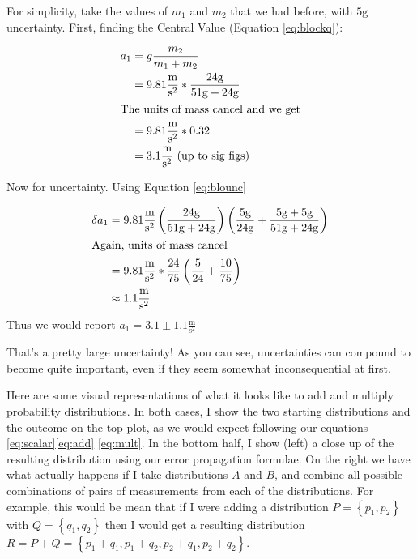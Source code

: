 \documentclass{article}
\begin{document}
  \begin{example}

    For simplicity, take the values of $m_1$ and $m_2$ that we had before, with $5 \mathrm{g}$ uncertainty. First, finding the Central Value (Equation \eqref{eq:blockq}):

    \begin{align}
      a_1&=g\frac{m_2}{m_1+m_2}\\
      &=9.81 \frac{\mathrm{m}}{\mathrm{s}^2} *  \frac{24 \mathrm{g}}{51 \mathrm{g} + 24 \mathrm{g}}\\
      \intertext{The units of mass cancel and we get}
      &= 9.81 \frac{\mathrm{m}}{\mathrm{s}^2} * 0.32\\
      &= 3.1\frac{\mathrm{m}}{\mathrm{s}^2} \text{ (up to sig figs)}
    \end{align}

    Now for uncertainty. Using Equation \eqref{eq:blounc}

    \begin{align}
      \delta a_1 &=  9.81 \frac{\mathrm{m}}{\mathrm{s}^2}\left(\frac{24 \mathrm{g}}{51 \mathrm{g}+24 \mathrm{g}}\right)\left(\frac{5 \mathrm{g}}{24 \mathrm{g}} + \frac{ 5 \mathrm{g} + 5 \mathrm{g}}{51 \mathrm{g} + 24 \mathrm{g}}\right)\\
      \intertext{Again, units of mass cancel}
      &= 9.81 \frac{\mathrm{m}}{\mathrm{s}^2} * \frac{24}{75}\left(\frac{5}{24} + \frac{10}{75}\right)\\
      &\approx 1.1  \frac{\mathrm{m}}{\mathrm{s}^2}
    \end{align}
    Thus we would report $a_1 = 3.1 \pm 1.1\frac{\mathrm{m}}{\mathrm{s}^2}$
  \end{example}

  That's a pretty large uncertainty! As you can see, uncertainties can compound to become quite important, even if they seem somewhat inconsequential at first.

  Here are some visual representations of what it looks like to add and multiply probability distributions. In both cases, I show the two starting distributions and the outcome on the top plot, as we would expect following our equations \eqref{eq:scalar}\eqref{eq:add} \eqref{eq:mult}.
  In the bottom half, I show (left) a close up of the resulting distribution using our error propagation formulae. On the right we have what actually happens if I take distributions $A$ and $B$, and combine all possible combinations of pairs of measurements from each of the distributions.
  For example, this would be mean that if I were adding a distribution $P = \left\{p_1,p_2\right\}$ with $Q=\left\{q_1,q_2\right\}$ then I would get a resulting distribution $R=P+Q=\left\{p_1+q_1,p_1+q_2,p_2+q_1,p_2+q_2\right\}$.
\end{document}
